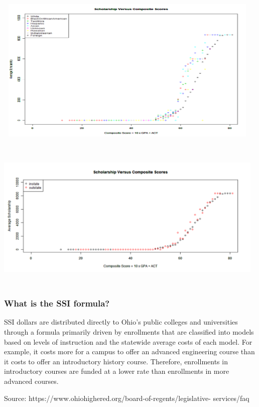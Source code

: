\documentclass[aspectratio=169]{beamer}
\begin{document}
\begin{frame}
\frametitle{}
\includegraphics[width=13cm, height=7cm, scale = 0.5]
{pic/ethnicity.png}
\end{frame}



\begin{frame}
\frametitle{}
\includegraphics[width=13cm, height=7cm, scale = 0.5]
{pic/state.png}
\end{frame}


\begin{frame}
\frametitle{What is the SSI formula?}

SSI dollars are distributed directly to Ohio's public colleges 
and universities through a formula primarily driven by enrollments that 
are classified into models based on levels of instruction and the 
statewide average costs of each model. For example, it costs more for a 
campus to offer an advanced engineering course than it costs to offer an
introductory history course. Therefore, enrollments in introductory 
courses are funded at a lower rate than enrollments in more advanced 
courses.

Source: https://www.ohiohighered.org/board-of-regents/legislative-
services/faq
\end{frame}
\end{document}
